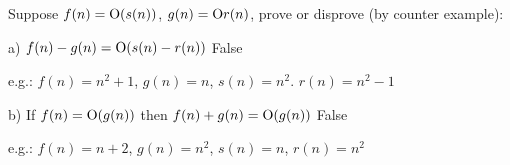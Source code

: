 \begin{prob}

Suppose $f(n) = {\rm O}(s(n))$, $g(n) = {\rm O}{r(n)}$, prove or disprove (by counter example):

a) $f(n) - g(n) = {\rm O}(s(n) - r(n))$ False

e.g.: $f(n) = n^2 + 1$, $g(n) = n$, $s(n) = n^2$. $r(n) = n^2 - 1$

b) If $f(n) = {\rm O}(g(n))$ then $f(n) + g(n) = {\rm O}(g(n))$ False

e.g.: $f(n) = n + 2$, $g(n) = n^2$, $s(n) = n$, $r(n) = n^2$
\end{prob}















